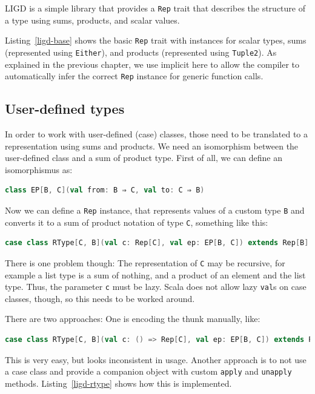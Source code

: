 \documentclass[abstracton,parskip=half]{scrreprt}
\newcommand{\cd}{\texttt}
\begin{document}
    LIGD is a simple library that provides a \cd{Rep} trait that describes
    the structure of a type using sums, products, and scalar values.

    Listing~\ref{ligd-base} shows the basic \cd{Rep} trait with instances for
    scalar types, sums (represented using \cd{Either}), and products (represented
    using \cd{Tuple2}). As explained in the previous chapter, we use implicit
    here to allow the compiler to automatically infer the correct \cd{Rep}
    instance for generic function calls.



    \subsection{User-defined types}
    In order to work with user-defined (case) classes, those need to be
    translated to a representation using sums and products. We need an
    isomorphism between the user-defined class and a sum of product type. First
    of all, we can define an isomorphismus as:
    \begin{lstlisting}[language=scala,gobble=6]
      class EP[B, C](val from: B ⇒ C, val to: C ⇒ B)
    \end{lstlisting}
    Now we can define a \cd{Rep} instance, that represents values of a custom
    type \cd{B} and converts it to a sum of product notation of type \cd{C},
    something like this:
    \begin{lstlisting}[language=scala,gobble=6]
      case class RType[C, B](val c: Rep[C], val ep: EP[B, C]) extends Rep[B]
    \end{lstlisting}
    There is one problem though: The representation of \cd{C} may be recursive,
    for example a list type is a sum of nothing, and a product of an element and
    the list type. Thus, the parameter \cd{c} must be lazy. Scala does not allow
    lazy \cd{val}s on case classes, though, so this needs to be worked around.

    There are two approaches: One is encoding the thunk manually, like:
    \begin{lstlisting}[language=scala,gobble=6]
      case class RType[C, B](val c: () => Rep[C], val ep: EP[B, C]) extends Rep[B]
    \end{lstlisting}
    This is very easy, but looks inconsistent in usage. Another approach is to
    not use a case class and provide a companion object with custom \cd{apply}
    and \cd{unapply} methods. Listing~\ref{ligd-rtype} shows how this is
    implemented.
    
\end{document}
